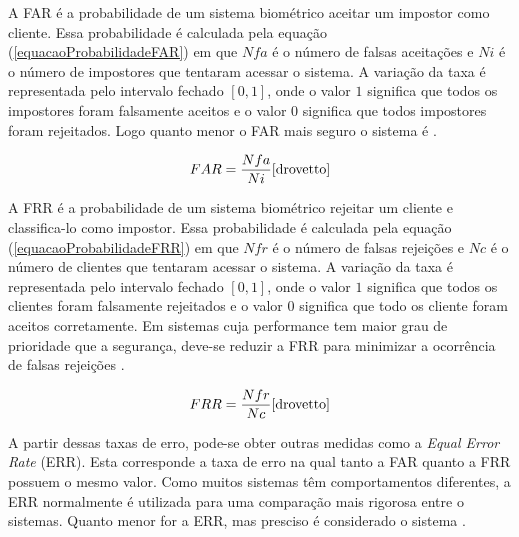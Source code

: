 A FAR é a probabilidade de um sistema biométrico aceitar um impostor como cliente. Essa probabilidade é calculada pela equação (\ref{equacaoProbabilidadeFAR}) em que $\displaystyle Nfa$ é o número de falsas aceitações e $\displaystyle Ni$ é o número de impostores que tentaram acessar o sistema. A variação da taxa é representada pelo intervalo fechado $\displaystyle [0,1]$, onde o valor $\displaystyle 1$ significa que todos os impostores foram falsamente aceitos e o valor $\displaystyle 0$ significa que todos impostores foram rejeitados. Logo quanto menor o FAR mais seguro o sistema é \cite{drovetto}.

	\begin{equation}
		FAR = \frac{Nfa}{Ni} \cite{drovetto}
		\label{equacaoProbabilidadeFAR}
	\end{equation} 

A FRR é a probabilidade de um sistema biométrico rejeitar um cliente e classifica-lo como impostor. Essa probabilidade é calculada pela equação (\ref{equacaoProbabilidadeFRR}) em que $\displaystyle Nfr$ é o número de falsas rejeições e $\displaystyle Nc$ é o número de clientes que tentaram acessar o sistema. A variação da taxa é representada pelo intervalo fechado $\displaystyle [0,1]$, onde o valor $\displaystyle 1$ significa que todos os clientes foram falsamente rejeitados e o valor $\displaystyle 0$ significa que todo os cliente foram aceitos corretamente. Em sistemas cuja performance tem maior grau de prioridade que a segurança, deve-se reduzir a FRR para minimizar a ocorrência de falsas rejeições \cite{drovetto}.

	\begin{equation}
		FRR = \frac{Nfr}{Nc} \cite{drovetto}
		\label{equacaoProbabilidadeFRR}
	\end{equation} 

A partir dessas taxas de erro, pode-se obter outras medidas como a \textit{Equal Error Rate} (ERR). Esta corresponde a taxa de erro na qual tanto a FAR quanto a FRR possuem o mesmo valor. Como muitos sistemas têm comportamentos diferentes, a ERR normalmente é utilizada para uma comparação mais rigorosa entre o sistemas. Quanto menor for a ERR, mas presciso é considerado o sistema \cite{drovetto}.
